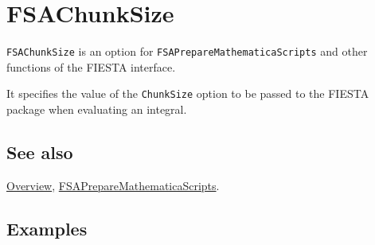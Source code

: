 \documentclass[../FeynHelpersManual.tex]{subfiles}
\begin{document}
\hypertarget{fsachunksize}{
\section{FSAChunkSize}\label{fsachunksize}}

\texttt{FSAChunkSize} is an option for
\texttt{FSAPrepareMathematicaScripts} and other functions of the FIESTA
interface.

It specifies the value of the \texttt{ChunkSize} option to be passed to
the FIESTA package when evaluating an integral.

\subsection{See also}

\hyperlink{toc}{Overview},
\hyperlink{fsapreparemathematicascripts}{FSAPrepareMathematicaScripts}.

\subsection{Examples}
\end{document}
